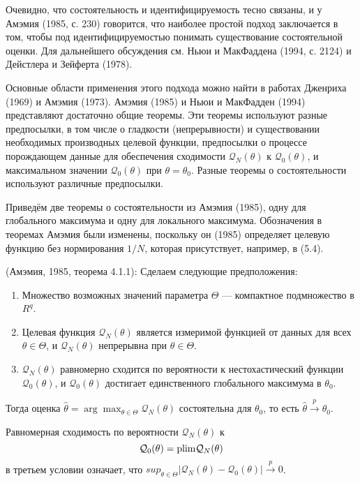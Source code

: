 Очевидно, что состоятельность и идентифицируемость тесно связаны, и у Амэмия (1985, с. 230) говорится, что наиболее простой подход заключается в том, чтобы под идентифицируемостью понимать существование состоятельной оценки. Для дальнейшего обсуждения см. Ньюи и МакФаддена (1994, с. 2124) и Дейстлера и Зейферта (1978).

Основные области применения этого подхода можно найти в работах Дженриха (1969) и Амэмия (1973). Амэмия (1985) и Ньюи и МакФадден (1994) представляют достаточно общие теоремы. Эти теоремы используют разные предпосылки, в том числе о гладкости (непрерывности) и существовании необходимых производных целевой функции, предпосылки о процессе порождающем данные для обеспечения сходимости $\mathcal{Q}_N(\theta)$  к $\mathcal{Q}_0(\theta)$, и максимальном значении $\mathcal{Q}_0(\theta)$  при $\theta=\theta_0$. Разные теоремы о состоятельности используют различные предпосылки.

Приведём две теоремы о состоятельности из Амэмия (1985), одну для глобального максимума и одну для локального максимума. Обозначения в теоремах Амэмия были изменены, поскольку он (1985) определяет целевую функцию без нормирования $1/N$, которая присутствует, например, в (5.4).

\begin{theorem} (Амэмия, 1985, теорема 4.1.1): 
Сделаем следующие предположения:
\begin{enumerate}
\item Множество возможных значений параметра $\Theta$ --- компактное подмножество в $R^q$.
\item Целевая функция $\mathcal{Q}_N(\theta)$ является измеримой функцией от данных для всех $\theta \in \Theta$, и $\mathcal{Q}_N(\theta)$ непрерывна при $\theta \in \Theta$.
\item $\mathcal{Q}_N(\theta)$ равномерно сходится по вероятности к нестохастический функции $\mathcal{Q}_0(\theta)$, и $\mathcal{Q}_0(\theta)$ достигает единственного глобального максимума в $\theta_0$.
\end{enumerate}

Тогда оценка $\hat{\theta}= \arg\max _{\theta \in \Theta} \mathcal{Q}_N(\theta)$ состоятельна для $\theta_0$, то есть $ \hat{\theta} \xrightarrow{p} \theta_0$.
\end{theorem}


Равномерная сходимость по вероятности $\mathcal{Q}_N(\theta)$ к 
\begin{equation}
\mathcal{Q}_0(\theta)=\mathrm{plim } \mathcal{Q}_N(\theta)
\end{equation}
в третьем условии означает, что $sup _{\theta \in \Theta} |\mathcal{Q}_N(\theta)-\mathcal{Q}_0(\theta)| \xrightarrow{p} 0$.

